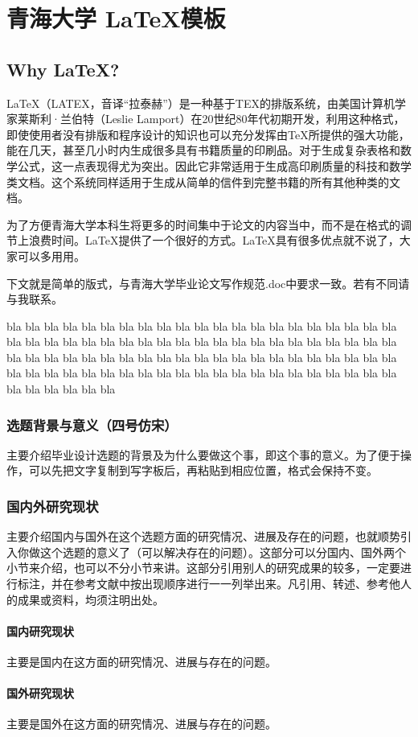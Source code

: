 
\chapter{青海大学 \LaTeX 模板}
\section{Why \LaTeX ? }
\LaTeX（LATEX，音译“拉泰赫”）是一种基于TEX的排版系统，由美国计算机学家莱斯利·兰伯特（Leslie Lamport）在20世纪80年代初期开发，利用这种格式，即使使用者没有排版和程序设计的知识也可以充分发挥由\TeX{}所提供的强大功能，能在几天，甚至几小时内生成很多具有书籍质量的印刷品。对于生成复杂表格和数学公式，这一点表现得尤为突出。因此它非常适用于生成高印刷质量的科技和数学类文档。这个系统同样适用于生成从简单的信件到完整书籍的所有其他种类的文档。

为了方便青海大学本科生将更多的时间集中于论文的内容当中，而不是在格式的调节上浪费时间。\LaTeX 提供了一个很好的方式。\LaTeX 具有很多优点就不说了，大家可以多用用。
\par 下文就是简单的版式，与青海大学毕业论文写作规范.doc中要求一致。若有不同请与我联系。

bla bla bla bla bla bla bla bla bla bla bla bla bla bla bla bla bla bla bla bla bla bla bla bla bla bla bla bla bla bla bla bla bla bla bla bla bla bla bla bla bla bla bla bla bla bla bla bla bla bla bla bla bla bla bla bla bla bla bla bla bla bla bla bla bla bla bla bla bla bla bla bla bla bla bla bla bla bla bla bla bla bla bla bla bla bla bla bla bla bla

\subsection{选题背景与意义（四号仿宋）}
主要介绍毕业设计选题的背景及为什么要做这个事，即这个事的意义。为了便于操作，可以先把文字复制到写字板后，再粘贴到相应位置，格式会保持不变。
\subsection{国内外研究现状}
主要介绍国内与国外在这个选题方面的研究情况、进展及存在的问题，也就顺势引入你做这个选题的意义了（可以解决存在的问题）。这部分可以分国内、国外两个小节来介绍，也可以不分小节来讲。这部分引用别人的研究成果的较多，一定要进行标注，并在参考文献中按出现顺序进行一一列举出来。凡引用、转述、参考他人的成果或资料，均须注明出处。
\subsubsection{国内研究现状}
主要是国内在这方面的研究情况、进展与存在的问题。
\subsubsection{国外研究现状}
主要是国外在这方面的研究情况、进展与存在的问题。
